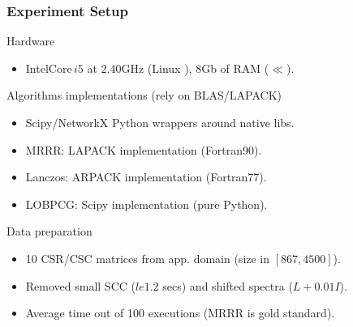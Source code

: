  \begin{frame}
  \frametitle{Experiment Setup}
  \begin{block}{Hardware}
    \begin{itemize}
    \item Intel\textregistered Core\texttrademark $\,i5$ at $2.40$GHz
      (Linux ), $8$Gb of RAM ($\ll$).
    \end{itemize}
  \end{block}
  \begin{block}{Algorithms implementations (rely on BLAS/LAPACK)}
    \begin{itemize}
    \item Scipy/NetworkX Python wrappers around native libs.
    \item MRRR: LAPACK implementation (Fortran90).
    \item Lanczos: ARPACK implementation (Fortran77).
    \item LOBPCG: Scipy implementation (pure Python).
    \end{itemize}
  \end{block}
  \begin{block}{Data preparation}
    \begin{itemize}
    \item 10 CSR/CSC matrices from app. domain (size in $[867,4500]$).
    \item Removed small SCC ($le 1.2$ secs) and shifted spectra ($L + 0.01I$).
    \item Average time out of 100 executions (MRRR is gold standard).
    \end{itemize}
  \end{block}    
\end{frame}
